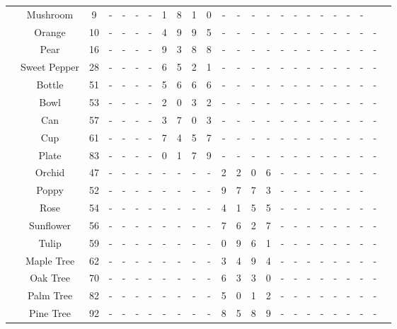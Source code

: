 \begin{table*}[t!]
{\begin{tabular}{c c c c cccccccccccccccccccc}
        & Mushroom & 9 & - & - & - & - & 1 & 8 & 1 & 0 & - & - & - & - & - & - & - & - & - & - & - \\
        & Orange & 10 & - & - & - & - & 4 & 9 & 9 & 5 & - & - & - & - & - & - & - & - & - & - & - & - \\
        & Pear & 16 &  - & - & - & - & 9 & 3 & 8 & 8 & - & - & - & - & - & - & - & - & - & - & - & - \\
        & Sweet Pepper & 28 & - & - & - & - & 6 & 5 & 2 & 1 & - & - & - & - & - & - & - & - & - & - & - & - \\
        & Bottle & 51 & - & - & - & - & 5 & 6 & 6 & 6 & - & - & - & - & - & - & - & - & - & - & - & - \\
        & Bowl & 53 & - & - & - & - & 2 & 0 & 3 & 2 & - & - & - & - & - & - & - & - & - & - & - & - \\
        & Can & 57 & - & - & - & - & 3 & 7 & 0 & 3 & - & - & - & - & - & - & - & - & - & - & - & - \\
        & Cup & 61 & - & - & - & - & 7 & 4 & 5 & 7 & - & - & - & - & - & - & - & - & - & - & - & - \\
        & Plate & 83 & - & - & - & - & 0 & 1 & 7 & 9 & - & - & - & - & - & - & - & - & - & - & - & - \\
        \midrule
        & Orchid & 47  & - & - & - & - & - & - & - & - & 2 & 2 & 0 & 6 & - & - & - & - & - & - & - & - \\
        & Poppy & 52  & - & - & - & - & - & - & - & - & 9 & 7 & 7 & 3 & - & - & - & - & - & - & - \\
        & Rose & 54  & - & - & - & - & - & - & - & - & 4 & 1 & 5 & 5 & - & - & - & - & - & - & - & - \\
        & Sunflower & 56  &  - & - & - & - & - & - & - & - & 7 & 6 & 2 & 7 & - & - & - & - & - & - & - & - \\
        & Tulip & 59  & - & - & - & - & - & - & - & - & 0 & 9 & 6 & 1 & - & - & - & - & - & - & - & - \\
        & Maple Tree & 62  & - & - & - & - & - & - & - & - & 3 & 4 & 9 & 4 & - & - & - & - & - & - & - & - \\
        & Oak Tree & 70  & - & - & - & - & - & - & - & - & 6 & 3 & 3 & 0 & - & - & - & - & - & - & - & - \\
        & Palm Tree & 82  & - & - & - & - & - & - & - & - & 5 & 0 & 1 & 2 & - & - & - & - & - & - & - & - \\
        & Pine Tree & 92  & - & - & - & - & - & - & - & - & 8 & 5 & 8 & 9 & - & - & - & - & - & - & - & - \\

\end{tabular}}
\end{table*}
